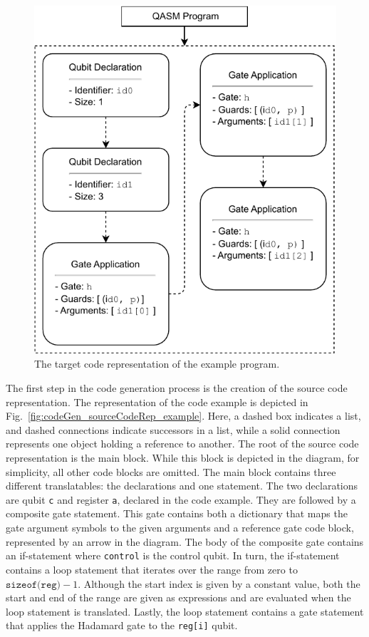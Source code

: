\begin{figure}
\begin{minipage}{.45\textwidth}
        \includegraphics[width=\textwidth]{../figures/drawio/codeGen_targetCode_example.pdf}
        \caption{The target code representation of the example program.}    
        \label{fig:implementation_targetCodeRep_example}
    \end{minipage}
\end{figure}

The first step in the code generation process is the creation of the source code representation. The representation of the code example is depicted in Fig.~\ref{fig:codeGen_sourceCodeRep_example}. 
Here, a dashed box indicates a list, and dashed connections indicate successors in a list, while a solid connection represents one object holding a reference to another.
The root of the source code representation is the main block. While this block is depicted in the diagram, for simplicity, all other code blocks are omitted. The main block contains three different translatables: the declarations and one statement. The two declarations are qubit \texttt{c} and register \texttt{a}, declared in the code example. They are followed by a composite gate statement. This gate contains both a dictionary that maps the gate argument symbols to the given arguments and a reference gate code block, represented by an arrow in the diagram. The body of the composite gate contains an if-statement where \texttt{control} is the control qubit. In turn, the if-statement contains a loop statement that iterates over the range from zero to $\texttt{sizeof(reg)} - 1$. Although the start index is given by a constant value, both the start and end of the range are given as expressions and are evaluated when the loop statement is translated. Lastly, the loop statement contains a gate statement that applies the Hadamard gate to the \texttt{reg[i]} qubit.

